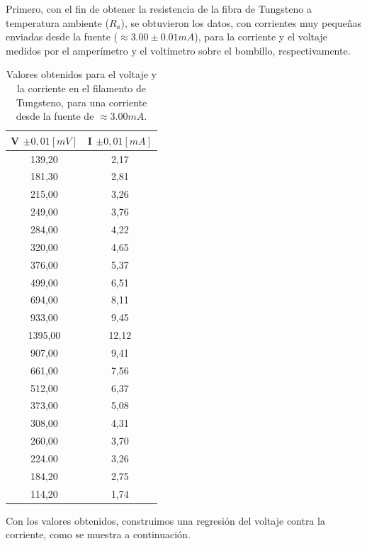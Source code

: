 \documentclass[%
 reprint,
 amsmath,amssymb,
 aps,
]{revtex4-1}
\begin{document}
Primero, con el fin de obtener la resistencia de la fibra de Tungsteno a temperatura ambiente ($R_{a}$), se obtuvieron los datos, con corrientes muy pequeñas enviadas desde la fuente ($\approx 3.00 \pm 0.01 mA$), para la corriente y el voltaje medidos por el amperímetro y el voltímetro sobre el bombillo, respectivamente. 

\begin{table}[htbp]
  \centering  
  \caption{Valores obtenidos para el voltaje y la corriente en el filamento de Tungsteno, para una corriente desde la fuente de $\approx 3.00 mA$.}
   
   \begin{tabular}{|c|c|}
   \hline
    \multicolumn{1}{|c|}{V $\pm 0,01 [mV]$} &
    \multicolumn{1}{c|}{I $\pm 0,01 [mA] $} \\ 
    \hline
    139,20   & 2,17 \\ \hline
    181,30   & 2,81 \\ \hline
    215,00   & 3,26 \\ \hline
    249,00   & 3,76 \\ \hline
    284,00   & 4,22 \\ \hline
    320,00   & 4,65 \\ \hline
    376,00   & 5,37 \\ \hline
    499,00   & 6,51 \\ \hline
    694,00   & 8,11 \\ \hline
    933,00   & 9,45 \\ \hline
    1395,00  & 12,12 \\ \hline
    907,00   & 9,41 \\ \hline
    661,00   & 7,56 \\ \hline
    512,00   & 6,37 \\ \hline
    373,00   & 5,08 \\ \hline
    308,00   & 4,31 \\ \hline
    260,00   & 3,70 \\ \hline
    224.00   & 3,26 \\ \hline
    184,20   & 2,75 \\ \hline
    114,20   & 1,74 \\ \hline
    \end{tabular}%
  \label{tab:VvsI}%
\end{table}%

Con los valores obtenidos, construimos una regresión del voltaje contra la corriente, como se muestra a continuación. 
\end{document}
